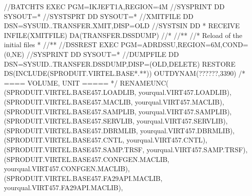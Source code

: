 \documentclass[letterpaper,10pt,english]{sphinxmanual}
\begin{document}
\begin{sphinxVerbatim}[commandchars=\\\{\}]
//BATCHTS EXEC PGM=IKJEFT1A,REGION=4M
//SYSPRINT DD SYSOUT=*
//SYSTSPRT DD SYSOUT=*
//XMITFILE DD DSN=\PYGZam{}SYSUID..TRANSFER.XMIT,DISP=OLD
//SYSTSIN DD *
RECEIVE INFILE(XMITFILE) DA(TRANSFER.DSSDUMP)
//*
//*\PYGZhy{}\PYGZhy{}\PYGZhy{}\PYGZhy{}\PYGZhy{}\PYGZhy{}\PYGZhy{}\PYGZhy{}\PYGZhy{}\PYGZhy{}\PYGZhy{}\PYGZhy{}\PYGZhy{}\PYGZhy{}\PYGZhy{}\PYGZhy{}\PYGZhy{}\PYGZhy{}\PYGZhy{}\PYGZhy{}\PYGZhy{}\PYGZhy{}\PYGZhy{}\PYGZhy{}\PYGZhy{}\PYGZhy{}\PYGZhy{}\PYGZhy{}\PYGZhy{}\PYGZhy{}\PYGZhy{}\PYGZhy{}\PYGZhy{}\PYGZhy{}\PYGZhy{}\PYGZhy{}\PYGZhy{}\PYGZhy{}\PYGZhy{}\PYGZhy{}\PYGZhy{}\PYGZhy{}\PYGZhy{}\PYGZhy{}\PYGZhy{}\PYGZhy{}\PYGZhy{}\PYGZhy{}\PYGZhy{}\PYGZhy{}\PYGZhy{}\PYGZhy{}\PYGZhy{}\PYGZhy{}\PYGZhy{}\PYGZhy{}\PYGZhy{}\PYGZhy{}\PYGZhy{}\PYGZhy{}\PYGZhy{}\PYGZhy{}\PYGZhy{}\PYGZhy{}\PYGZhy{}\PYGZhy{}\PYGZhy{}*
//* Reload of the initial files *
//*\PYGZhy{}\PYGZhy{}\PYGZhy{}\PYGZhy{}\PYGZhy{}\PYGZhy{}\PYGZhy{}\PYGZhy{}\PYGZhy{}\PYGZhy{}\PYGZhy{}\PYGZhy{}\PYGZhy{}\PYGZhy{}\PYGZhy{}\PYGZhy{}\PYGZhy{}\PYGZhy{}\PYGZhy{}\PYGZhy{}\PYGZhy{}\PYGZhy{}\PYGZhy{}\PYGZhy{}\PYGZhy{}\PYGZhy{}\PYGZhy{}\PYGZhy{}\PYGZhy{}\PYGZhy{}\PYGZhy{}\PYGZhy{}\PYGZhy{}\PYGZhy{}\PYGZhy{}\PYGZhy{}\PYGZhy{}\PYGZhy{}\PYGZhy{}\PYGZhy{}\PYGZhy{}\PYGZhy{}\PYGZhy{}\PYGZhy{}\PYGZhy{}\PYGZhy{}\PYGZhy{}\PYGZhy{}\PYGZhy{}\PYGZhy{}\PYGZhy{}\PYGZhy{}\PYGZhy{}\PYGZhy{}\PYGZhy{}\PYGZhy{}\PYGZhy{}\PYGZhy{}\PYGZhy{}\PYGZhy{}\PYGZhy{}\PYGZhy{}\PYGZhy{}\PYGZhy{}\PYGZhy{}\PYGZhy{}\PYGZhy{}*
//DSSREST EXEC PGM=ADRDSSU,REGION=6M,COND=(0,NE)
//SYSPRINT DD SYSOUT=*
//DUMPFILE DD DSN=\PYGZam{}SYSUID..TRANSFER.DSSDUMP,DISP=(OLD,DELETE)
RESTORE \PYGZhy{}
DS(INCLUDE(SPRODUIT.VIRTEL.BASE*.**)) \PYGZhy{}
OUTDYNAM(??????,3390) /* \PYGZlt{}==== VOLUME, UNIT ===== */ \PYGZhy{}
RENAMEUNC( \PYGZhy{}
    (SPRODUIT.VIRTEL.BASE457.LOADLIB, \PYGZhy{}
            yourqual.VIRT457.LOADLIB), \PYGZhy{}
    (SPRODUIT.VIRTEL.BASE457.MACLIB, \PYGZhy{}
            yourqual.VIRT457.MACLIB), \PYGZhy{}
    (SPRODUIT.VIRTEL.BASE457.SAMPLIB, \PYGZhy{}
            yourqual.VIRT457.SAMPLIB), \PYGZhy{}
    (SPRODUIT.VIRTEL.BASE457.SERVLIB, \PYGZhy{}
            yourqual.VIRT457.SERVLIB), \PYGZhy{}
    (SPRODUIT.VIRTEL.BASE457.DBRMLIB, \PYGZhy{}
            yourqual.VIRT457.DBRMLIB), \PYGZhy{}
    (SPRODUIT.VIRTEL.BASE457.CNTL, \PYGZhy{}
            yourqual.VIRT457.CNTL), \PYGZhy{}
    (SPRODUIT.VIRTEL.BASE457.SAMP.TRSF, \PYGZhy{}
            yourqual.VIRT457.SAMP.TRSF), \PYGZhy{}
    (SPRODUIT.VIRTEL.BASE457.CONFGEN.MACLIB, \PYGZhy{}
            yourqual.VIRT457.CONFGEN.MACLIB), \PYGZhy{}
    (SPRODUIT.VIRTEL.BASE457.FA29API.MACLIB, \PYGZhy{}
            yourqual.VIRT457.FA29API.MACLIB), \PYGZhy{}

\end{sphinxVerbatim}
\end{document}
